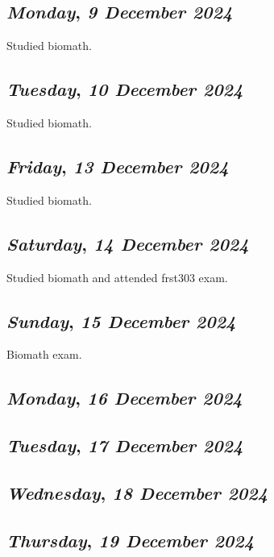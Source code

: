 \def\day{\textit{9 December 2024}}
\def\weekday{\textit{Monday}}
\subsection*{\weekday, \day}
Studied biomath.

\def\day{\textit{10 December 2024}}
\def\weekday{\textit{Tuesday}}
\subsection*{\weekday, \day}
Studied biomath.

\def\day{\textit{13 December 2024}}
\def\weekday{\textit{Friday}}
\subsection*{\weekday, \day}
Studied biomath.
\def\day{\textit{14 December 2024}}
\def\weekday{\textit{Saturday}}
\subsection*{\weekday, \day}
Studied biomath and attended frst303 exam.

\def\day{\textit{15 December 2024}}
\def\weekday{\textit{Sunday}}
\subsection*{\weekday, \day}
Biomath exam.

\def\day{\textit{16 December 2024}}
\def\weekday{\textit{Monday}}
\subsection*{\weekday, \day}

\def\day{\textit{17 December 2024}}
\def\weekday{\textit{Tuesday}}
\subsection*{\weekday, \day}

\def\day{\textit{18 December 2024}}
\def\weekday{\textit{Wednesday}}
\subsection*{\weekday, \day}

\def\day{\textit{19 December 2024}}
\def\weekday{\textit{Thursday}}
\subsection*{\weekday, \day}


